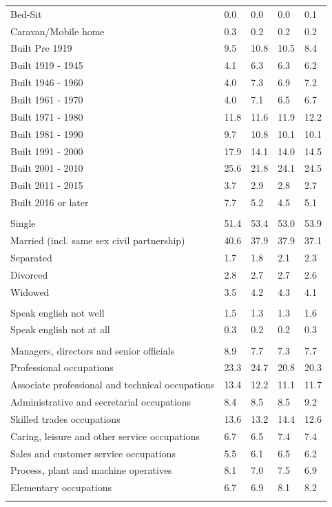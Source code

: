 \documentclass{article}
\begin{document}
\begin{table}[h]
\begin{tabular}{KTTTT}
Bed-Sit & 0.0& 0.0& 0.0& 0.1\\
Caravan/Mobile home & 0.3& 0.2& 0.2& 0.2\\
    \hline
Built Pre 1919 &  9.5& 10.8& 10.5&  8.4\\
Built 1919 - 1945 & 4.1& 6.3& 6.3& 6.2\\
Built  1946 - 1960 & 4.0& 7.3& 6.9& 7.2\\
Built  1961 - 1970 & 4.0& 7.1& 6.5& 6.7\\
Built  1971 - 1980 & 11.8& 11.6& 11.9& 12.2\\
Built  1981 - 1990 &  9.7& 10.8& 10.1& 10.1\\
Built  1991 - 2000 & 17.9& 14.1& 14.0& 14.5\\
Built  2001 - 2010 & 25.6& 21.8& 24.1& 24.5\\
Built  2011 - 2015 & 3.7& 2.9& 2.8& 2.7\\
Built  2016 or later & 7.7& 5.2& 4.5& 5.1\\
\hline
    \\
    \hline
Single & 51.4& 53.4& 53.0& 53.9\\
Married (incl. same sex civil partnership) & 40.6& 37.9& 37.9& 37.1\\
Separated  & 1.7& 1.8& 2.1& 2.3\\
Divorced  & 2.8& 2.7& 2.7& 2.6\\
Widowed & 3.5& 4.2& 4.3& 4.1\\
\hline
    \\ 
    \hline
Speak english not well & 1.5& 1.3& 1.3& 1.6\\
Speak english not at all & 0.3& 0.2& 0.2& 0.3\\
\hline
    \\
    \hline
Managers, directors and senior officials & 8.9& 7.7& 7.3& 7.7\\
Professional occupations & 23.3& 24.7& 20.8& 20.3\\
Associate professional and technical occupations & 13.4& 12.2& 11.1& 11.7\\
Administrative and secretarial occupations & 8.4& 8.5& 8.5& 9.2\\
Skilled trades occupations & 13.6& 13.2& 14.4& 12.6\\
Caring, leisure and other service occupations & 6.7& 6.5& 7.4& 7.4\\
Sales and customer service occupations & 5.5& 6.1& 6.5& 6.2\\
Process, plant and machine operatives & 8.1& 7.0& 7.5& 6.9\\
Elementary occupations & 6.7& 6.9& 8.1& 8.2\\
\hline
\end{tabular}
\end{table}
\end{document}
